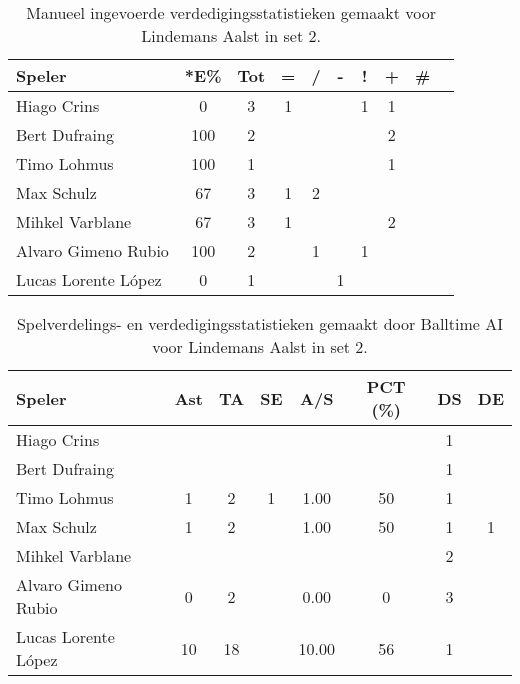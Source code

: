 \begin{table}[ht!]
  \centering
  \scriptsize
    \begin{tabular}{|l|c|c|c|c|c|c|c|c|c|}
      \hline
      \textbf{Speler} & *E\% & Tot & = & / & - & ! & + & \# \\ \hline
      Hiago Crins & 0 & 3 & 1 &  &  & 1 & 1 &  \\ 
      Bert Dufraing & 100 & 2 &  &  &  &  & 2 &  \\
      Timo Lohmus & 100 & 1 &  &  &  &  & 1 &  \\
      Max Schulz & 67 & 3 & 1 & 2 &  &  &  &  \\
      Mihkel Varblane & 67 & 3 & 1 &  &  &  & 2 &  \\
      Alvaro Gimeno Rubio & 100 & 2 &  & 1 &  & 1 &  &  \\
      Lucas Lorente López & 0 & 1 &  &  & 1 &  &  &  \\ \hline
  \end{tabular}
  \caption[Manueel ingevoerde verdedigingsstatistieken gemaakt voor Lindemans Aalst in set 2]{\label{tab:PL1DigAalstMan2}Manueel ingevoerde verdedigingsstatistieken gemaakt voor Lindemans Aalst in set 2.}
\end{table}

\begin{table}[ht!]
  \centering
  \scriptsize
  \begin{tabular}{|l|c|c|c|c|c|c|c|} \hline
    \textbf{Speler} & Ast & TA & SE & A/S & PCT (\%) & DS & DE \\ \hline
    Hiago Crins &  &  &  &  &  & 1 &  \\
    Bert Dufraing &  &  &  &  &  & 1 &  \\ 
    Timo Lohmus & 1 & 2 & 1 & 1.00 & 50 & 1 &  \\
    Max Schulz & 1 & 2 &  & 1.00 & 50 & 1 & 1 \\
    Mihkel Varblane &  &  &  &  &  & 2 &  \\
    Alvaro Gimeno Rubio & 0 & 2 &  & 0.00 & 0 & 3 &  \\
    Lucas Lorente López & 10 & 18 &  & 10.00 & 56 & 1 &  \\ \hline
  \end{tabular}
  \caption[Spelverdelings- en verdedigingsstatistieken gemaakt door Balltime AI voor Lindemans Aalst in set 2]{\label{tab:PL1SetDigAalstAI2}Spelverdelings- en verdedigingsstatistieken gemaakt door Balltime AI voor Lindemans Aalst in set 2.}
\end{table}

